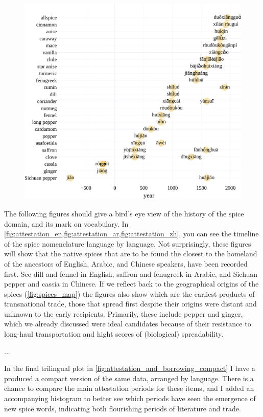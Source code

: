 \begin{figure}[!ht]
  \centering
  \includegraphics[width=\linewidth]{imgs/plots/attestation_zh.pdf}
  \caption{}
  \label{fig:attestation_zh}
\end{figure}

The following figures should give a bird's eye view of the history of the spice domain, and its mark on vocabulary. In \cref{fig:attestation_en,fig:attestation_ar,fig:attestation_zh}, you can see the timeline of the spice nomenclature language by language. Not surprisingly, these figures will show that the native spices that are to be found the closest to the homeland of the ancestors of English, Arabic, and Chinese speakers, have been recorded first. See dill and fennel in English, saffron and fenugreek in Arabic, and Sichuan pepper and cassia in Chinese. If we reflect back to the geographical origins of the spices (\cref{fig:spices_map}) the figures also show which are the earliest products of transnational trade, those that spread first despite their origins were distant and unknown to the early recipients. Primarily, these include pepper and ginger, which we already discussed were ideal candidates because of their resistance to long-haul transportation and hight scores of (biological) spreadability. 

...

In the final trilingual plot in \cref{fig:attestation_and_borrowing_compact} I have a produced a compact version of the same data, arranged by language. There is a chance to compare the main attestation periods for these items, and I added an accompanying histogram to better see which periods have seen the emergence of new spice words, indicating both flourishing periods of literature and trade. 

